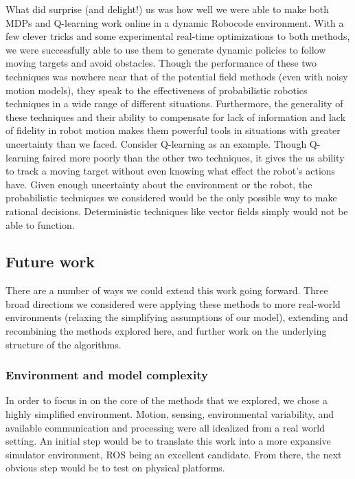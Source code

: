 \documentclass{aiaa-tc}%
\begin{document}
What did surprise (and delight!) us was how well we were able to make both MDPs and Q-learning work online in a dynamic Robocode environment. With a few clever tricks and some experimental real-time optimizations to both methods, we were successfully able to use them to generate dynamic policies to follow moving targets and avoid obstacles. Though the performance of these two techniques was nowhere near that of the potential field methods (even with noisy motion models), they speak to the effectiveness of probabilistic robotics techniques in a wide range of different situations. Furthermore, the generality of these techniques and their ability to compensate for lack of information and lack of fidelity in robot motion makes them powerful tools in situations with greater uncertainty than we faced. Consider Q-learning as an example. Though Q-learning faired more poorly than the other two techniques, it gives the us ability to track a moving target without even knowing what effect the robot's actions have. Given enough uncertainty about the environment or the robot, the probabilistic techniques we considered would be the only possible way to 
make rational decisions. Deterministic techniques like vector fields simply would not be able to function.


\subsection{Future work}

There are a number of ways we could extend this work going
forward. Three broad directions we considered were applying these methods to more real-world environments (relaxing the simplifying assumptions of our model), extending and recombining the methods explored here, and further work on the underlying structure of the algorithms.

\subsubsection{Environment and model complexity}

In order to focus in on the core of the methods that we explored, we chose a highly simplified environment. Motion, sensing, environmental variability, and available communication and processing were all idealized from a real world setting. An initial step would be to translate this work into a more expansive simulator environment, ROS being an excellent candidate. From there, the next obvious step would be to test on physical platforms.
\end{document}
